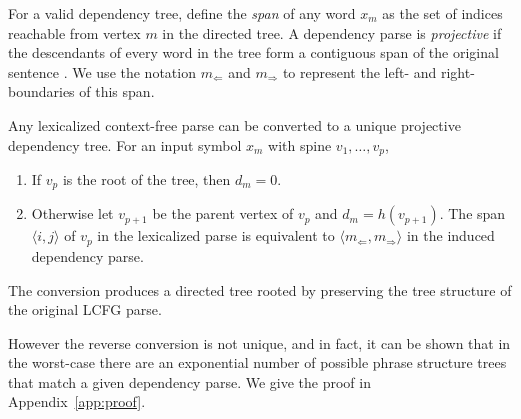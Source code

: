 \documentclass[11pt,letterpaper]{article}
\newcommand{\Left}[1]{#1_{\Leftarrow}}
\newcommand{\Right}[1]{#1_{\Rightarrow}}
\newcommand{\Span}[1]{\langle #1 \rangle}
\begin{document}
For a valid dependency tree, define the \textit{span} of any word $x_m$ as the set of indices reachable from vertex $m$ in the directed tree. A dependency parse is \textit{projective} if the descendants of every word in the tree form a contiguous span of the original sentence \cite{}. We use the notation $\Left{m}$ and $\Right{m}$ to represent the left- and
right-boundaries of this span.









Any lexicalized context-free parse can be converted to a unique projective dependency tree.
For an input symbol $x_m$ with spine $v_1, \ldots, v_p$,

\begin{enumerate}
\item If $v_p$ is the root of the tree,
then $d_m = 0$.
\item Otherwise let $v_{p+1}$ be the parent vertex of
$v_p$ and $d_m = h(v_{p+1})$. The span $\Span{i, j}$ of $v_p$ in the lexicalized parse is equivalent to $\Span{\Left{m}, \Right{m}}$
in the induced dependency parse.
\end{enumerate}



The conversion produces a directed tree rooted by preserving the tree structure of the original LCFG parse.

However the reverse conversion is not unique, and in fact, it can be shown that in the worst-case there are an
exponential number of possible phrase structure trees that match a given dependency parse. We give the proof in
Appendix~\ref{app:proof}.











\end{document}
